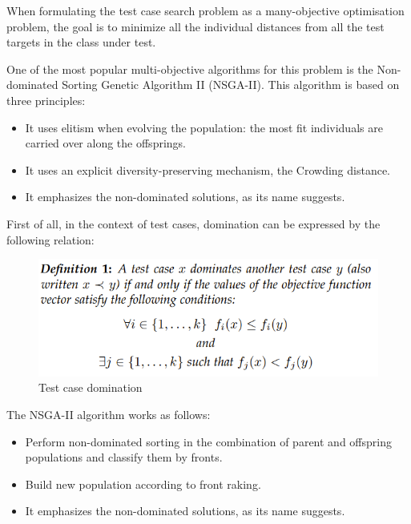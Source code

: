 When formulating the test case search problem as a many-objective optimisation problem, the goal is to minimize all the individual
distances from all the test targets in the class under test.


One of the most popular multi-objective algorithms for this problem is the Non-dominated Sorting Genetic Algorithm II (NSGA-II).
This algorithm is based on three principles:
\begin{itemize}
    \item It uses elitism when evolving the population: the most fit individuals are carried over along the offsprings.
    \item It uses an explicit diversity-preserving mechanism, the Crowding distance.
    \item It emphasizes the non-dominated solutions, as its name suggests.
\end{itemize}

First of all, in the context of test cases, domination can be expressed by the following relation:
\begin{figure}[htbp]
    \centering
    \includegraphics[scale=0.7]{./figures/test_Case_domination.PNG}
    \caption{Test case domination}
    \label{fig:test case domination}
\end{figure}

The NSGA-II algorithm works as follows:
\begin{itemize}
    \item Perform non-dominated sorting in the combination of parent and offspring populations and classify them by fronts.
    \item Build new population according to front raking.
    \item It emphasizes the non-dominated solutions, as its name suggests.
\end{itemize}

